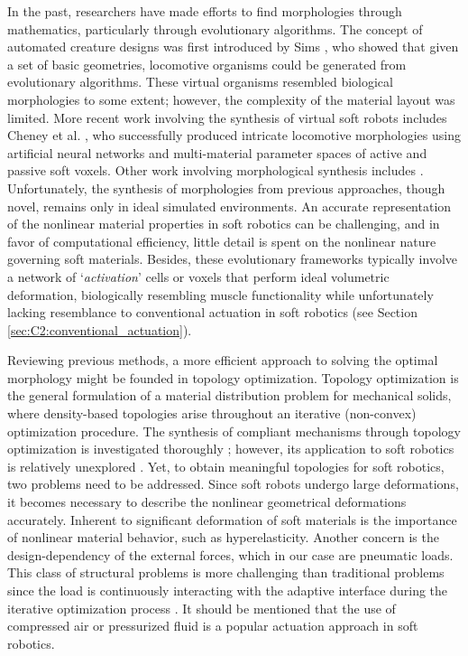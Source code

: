 In the past, researchers have made efforts to find morphologies through mathematics, particularly through evolutionary algorithms. The concept of automated creature designs was first introduced by Sims \cite{Sims1994}, who showed that given a set of basic geometries, locomotive organisms could be generated from evolutionary algorithms. These virtual organisms resembled biological morphologies to some extent; however, the complexity of the material layout was limited. More recent work involving the synthesis of virtual soft robots includes Cheney et al. \cite{Cheney2013}, who successfully produced intricate locomotive morphologies using artificial neural networks and multi-material parameter spaces of active and passive soft voxels. Other work involving morphological synthesis includes \cite{Bern2019, Morzadec2019Apr, Diepen2019}. Unfortunately, the synthesis of morphologies from previous approaches, though novel, remains only in ideal simulated environments. An accurate representation of the nonlinear material properties in soft robotics can be challenging, and in favor of computational efficiency, little detail is spent on the nonlinear nature governing soft materials. Besides, these evolutionary frameworks typically involve a network of `\textit{activation}' cells or voxels that perform ideal volumetric deformation, biologically resembling muscle functionality while unfortunately lacking resemblance to conventional actuation in soft robotics (see Section \ref{sec:C2:conventional_actuation}).

Reviewing previous methods, a more efficient approach to solving the optimal morphology might be founded in topology optimization. Topology optimization is the general formulation of a material distribution problem for mechanical solids, where density-based topologies arise throughout an iterative (non-convex) optimization procedure. The synthesis of compliant mechanisms through topology optimization is investigated thoroughly \cite{Bendsoe2003, Gain2013Dec, Luo2016Mar}; however, its application to soft robotics is relatively unexplored \cite{Zhang2017Topo, Zolfagharian2020Jun, Yuhn2023Feb}. Yet, to obtain meaningful topologies for soft robotics, two problems need to be addressed. Since soft robots undergo large deformations, it becomes necessary to describe the nonlinear geometrical deformations accurately. Inherent to significant deformation of soft materials is the importance of nonlinear material behavior, such as hyperelasticity. Another concern is the design-dependency of the external forces, which in our case are pneumatic loads. This class of structural problems is more challenging than traditional problems since the load is continuously interacting with the adaptive interface during the iterative optimization process \cite{Wang2016, Vasista2013Jul}. It should be mentioned that the use of compressed air or pressurized fluid is a popular actuation approach in soft robotics.

